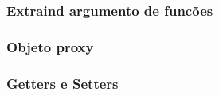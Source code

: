 \documentclass[10pt]{beamer}
\begin{document}
\begin{frame}
	
\end{frame}

\begin{frame}
	
\end{frame}

\begin{frame}
	\frametitle{Extraind argumento de funcões}
	
\end{frame}

\begin{frame}
	\frametitle{Objeto proxy}
	
\end{frame}

\begin{frame}
	\frametitle{Getters e Setters}
	
\end{frame}

\begin{frame}
	
\end{frame}
\end{document}

